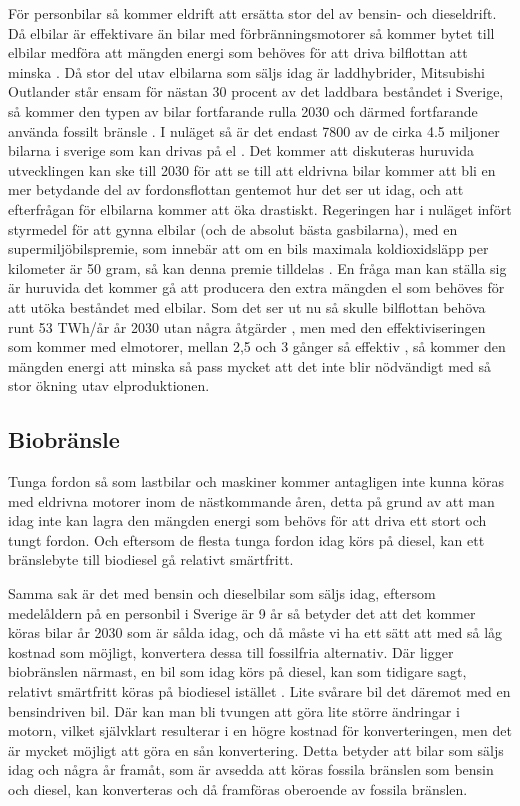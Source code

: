 \documentclass[a4paper,11pt,fleqn, titlepage]{article}
\begin{document}
För personbilar så kommer eldrift att ersätta stor del av bensin- och
dieseldrift. Då elbilar är effektivare än bilar med förbränningsmotorer så
kommer bytet till elbilar medföra att mängden energi som behöves för att
driva bilflottan att minska \cite[s.~25]{elforsk}. Då stor del utav
elbilarna som säljs idag är laddhybrider, Mitsubishi Outlander står ensam
för nästan 30 procent av det laddbara beståndet i Sverige, så kommer den
typen av bilar fortfarande rulla 2030 och därmed fortfarande använda
fossilt bränsle \cite{laddbarafordon}. I nuläget så är det endast
7800 av de cirka 4.5 miljoner bilarna i sverige som kan drivas på
el \cite{fordonsstatistik}.  Det kommer att diskuteras huruvida
utvecklingen kan ske till 2030 för att se till att eldrivna bilar kommer
att bli en mer betydande del av fordonsflottan gentemot hur det ser ut
idag, och att efterfrågan för elbilarna kommer att öka drastiskt.
Regeringen har i nuläget infört styrmedel för att gynna elbilar
(och de absolut bästa gasbilarna), med en supermiljöbilspremie, som innebär
att om en bils maximala koldioxidsläpp per kilometer är 50 gram, så kan denna
premie tilldelas \cite{ekonomiskastyrmedel}.
En fråga man kan ställa sig är huruvida det kommer gå att producera den
extra mängden el som behöves för att utöka beståndet med elbilar. Som det
ser ut nu så skulle bilflottan behöva runt 53 TWh/år år 2030 utan några
åtgärder \cite[s.~24]{elforsk}, men med
den effektiviseringen som kommer med elmotorer, mellan 2,5 och 3 gånger så
effektiv \cite[s.~29]{elforsk}, så kommer den
mängden energi att minska så pass mycket att det inte blir nödvändigt med
så stor ökning utav elproduktionen.

\subsection{Biobränsle}
Tunga fordon så som lastbilar och maskiner kommer antagligen inte kunna
köras med eldrivna motorer inom de nästkommande åren, detta på grund av att
man idag inte kan lagra den mängden energi som behövs för att driva ett
stort och tungt fordon. Och eftersom de flesta tunga fordon idag körs på
diesel, kan ett bränslebyte till biodiesel gå relativt smärtfritt.

Samma sak är det med bensin och dieselbilar som säljs idag, eftersom
medelåldern på en personbil i Sverige är 9 år \cite[s.~17]{elforsk} så
betyder det att det kommer köras bilar år 2030 som är sålda idag,
och då måste vi ha ett sätt att med så låg kostnad som möjligt, konvertera
dessa till fossilfria alternativ. Där ligger biobränslen närmast, en bil
som idag körs på diesel, kan som tidigare sagt, relativt smärtfritt köras
på biodiesel istället \cite{statoil}. Lite
svårare bil det däremot med en bensindriven bil. Där kan man bli tvungen
att göra lite större ändringar i motorn, vilket självklart resulterar i en
högre kostnad för konverteringen, men det är mycket möjligt att göra en sån
konvertering. Detta betyder att bilar som säljs idag och några år framåt,
som är avsedda att köras fossila bränslen som bensin och diesel, kan
konverteras och då framföras oberoende av fossila bränslen.
\end{document}
